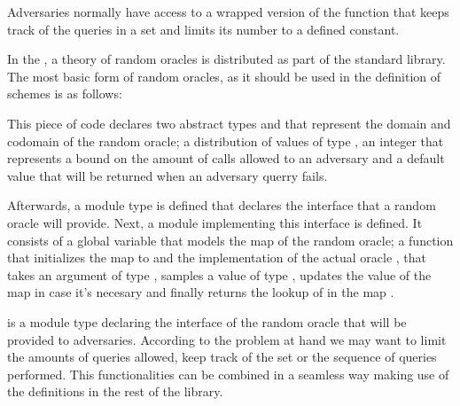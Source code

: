 Adversaries normally have access to a wrapped version of the function
that keeps track of the queries in a set and limits its number to a
defined constant.

In the \EC, a theory of random oracles is distributed as part of
the standard library. The most basic form of random oracles, as it
should be used in the definition of schemes is as follows:

This piece of code declares two abstract types  and 
that represent the domain and codomain of the random oracle; a
distribution  of values of type , an integer
 that represents a bound on the amount of calls allowed to an
adversary and a default value  that will be returned when
an adversary querry fails.

Afterwards, a module type  is defined that declares the
interface that a random oracle will provide. Next, a module 
implementing this interface is defined. It consists of a global
variable  that models the map of the random oracle; a function
 that initializes the map to  and the
implementation of the actual oracle , that takes an argument
 of type , samples a value  of type ,
updates the value of the map in case it's necesary and finally returns the
lookup of  in the map .

 is a module type declaring the interface of the random oracle
that will be provided to adversaries. According to the problem at hand
we may want to limit the amounts of queries allowed, keep track of the
set  or the sequence of queries performed. This functionalities can be
combined in a seamless way making use of the definitions in the rest
of the library. 


